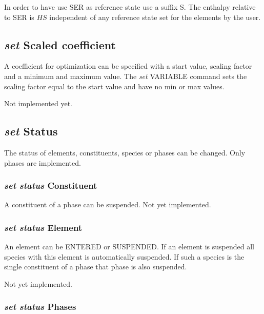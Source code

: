 \documentclass[11pt]{article}
\begin{document}
In order to have use SER as reference state use a suffix S.  The
enthalpy relative to SER is $HS$ independent of any reference state
set for the elements by the user.

\hypertarget{Set scaled coefficient}{}
\subsection{{\em set} Scaled coefficient}

A coefficient for optimization can be specified with a start value,
scaling factor and a minimum and maximum value.  The {\em set} VARIABLE
command sets the scaling factor equal to the start value and have no
min or max values.

Not implemented yet.

\hypertarget{Set status}{}
\subsection{{\em set} Status}

The status of elements, constituents, species or phases can be
changed.  Only phases are implemented.

\hypertarget{Set status constituent}{}
\subsubsection{{\em set status} Constituent}

A constituent of a phase can be suspended.  Not yet implemented.

\hypertarget{Set status element}{}
\subsubsection{{\em set status} Element}

An element can be ENTERED or SUSPENDED.  If an element is suspended
all species with this element is automatically suspended.  If such a
species is the single constituent of a phase that phase is also
suspended.

Not yet implemented.

\subsubsection{{\em set status} Phases}\label{sc:set-status-phase}
\hypertarget{Set status phase}{}
\end{document}
